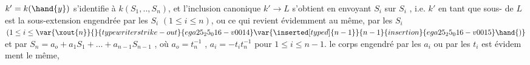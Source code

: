 $k' = k(\hand{y})$ s'identifie à $k(S_1,..,S_n)$, et l'inclusion canonique
$k'\longrightarrow L$ s'obtient en envoyant $S_i$ sur $S_i$ , i.e. $k'$ en tant que sous-%
 de $L$ est la sous-extension engendrée par les $S_i$ $(1\leq i\leq n)$, ou
ce qui revient évidemment au même, par les $S_i$ $(1\leq i\leq \var{\xout{n}}{}{typewriter strike-out}{ega25_25_016-v0014}\var{\inserted[typed]{n-1}}{n-1}{insertion}{ega25_25_016-v0015}\hand{)}$ et par
$S_n = a_o + a_1S_1 + \ldots + a_{n-1}S_{n-1}$ , où $a_o = t_n^{-1}$ , $a_i =-t_it_n^{-1}$ pour
$1\leq i\leq n-1$.  le corps engendré par les $a_i$ ou par les $t_i$ est évidem
ment le même, 

